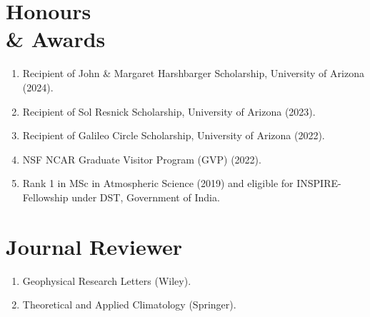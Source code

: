 \documentclass[margin,line]{resume}
\begin{document}
\begin{resume}
		\vspace*{-3mm}
				
		\section{\mysidestyle \textbf{\textcolor{sep}{Honours \\\& Awards}}}
		\begin{enumerate}[topsep=0.1pt, partopsep=1pt, itemsep=0.1pt, parsep=0.1pt, leftmargin=12pt,label=\roman{*})]
			\item Recipient of John \& Margaret Harshbarger Scholarship, University of Arizona (2024).
			\item Recipient of Sol Resnick Scholarship, University of Arizona (2023).
			\item Recipient of Galileo Circle Scholarship, University of Arizona (2022).
			\item NSF NCAR Graduate Visitor Program (GVP) (2022).
			\item Rank 1 in MSc in Atmospheric Science (2019) and eligible for INSPIRE-Fellowship under DST, Government of India.
			
		\end{enumerate} 
		\vspace*{-3mm}
	
		\section{\mysidestyle \textbf{\textcolor{sep}{Journal Reviewer}}}
		\begin{enumerate}[topsep=0.1pt, partopsep=1pt, itemsep=0.1pt, parsep=0.1pt, leftmargin=12pt,label=\roman{*})]
			\item Geophysical Research Letters (Wiley).
			\item Theoretical and Applied Climatology (Springer).
			

\end{enumerate}
\end{resume}
\end{document}
